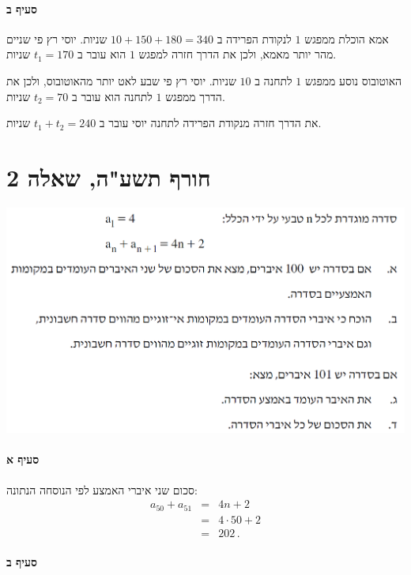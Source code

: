 \documentclass[12pt,a4paper]{article}
\begin{document}
\paragraph{סעיף ב}


אמא הוכלת ממפגש 
$1$
לנקודת הפרידה ב
$10+150+180=340$
שניות. יוסי רץ פי שניים מהר יותר מאמא, ולכן את הדרך חזרה למפגש
$1$
הוא עובר ב
$t_1=170$
שניות.

האוטובוס נוסע ממפגש 
$1$
לתחנה ב
$10$
שניות. יוסי רץ פי שבע לאט יותר מהאוטובוס, ולכן את הדרך ממפגש
$1$
לתחנה הוא עובר ב
$t_2=70$
שניות.

את הדרך חזרה מנקודת הפרידה לתחנה יוסי עובר ב
$t_1+t_2=240$
שניות.





\newpage


\section*{חורף תשע"ה, שאלה 2}

\begin{center}
\includegraphics[width=.8\textwidth]{winter-2015-2}
\end{center}

\paragraph{סעיף א}
סכום שני איברי האמצע לפי הנוסחה הנתונה:
\begin{eqnarray*}
a_{50} + a_{51} &=& 4n+2\\
&=&4\cdot 50 +2\\
&=& 202\,.
\end{eqnarray*}

\vspace{-4ex}\paragraph{סעיף ב}
\end{document}
